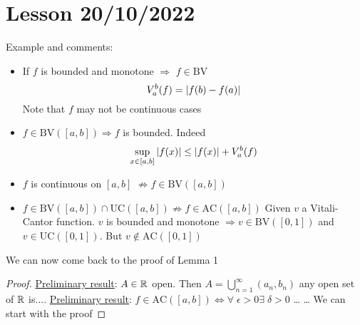 \section{Lesson 20/10/2022}
Example and comments:
\begin{itemize}
    \item If \(f\) is bounded and monotone \(\Longrightarrow\) \(f \in \mbox{BV}\)
    \[
        V_a^b (f) = \abs{f(b) - f(a)}
    \]
    Note that \(f\) may not be continuous
    cases
    \item \(f \in \mbox{BV}([a,b]) \Longrightarrow f\) is bounded. Indeed
    \[
        \sup_{x \in [a,b]} \abs{f(x)} \leq \abs{f(x)} + V_a^b(f)
    \]
    \item \(f\) is continuous on \([a,b]\) \(\not\Longrightarrow f \in \mbox{BV}([a,b])\)
    \item \(f \in \mbox{BV}([a,b]) \cap \mbox{UC}([a,b]) \not \Longrightarrow f \in \mbox{AC}([a,b])\)
    Given \(v\) a Vitali-Cantor function. \(v\) is bounded and monotone \(\Longrightarrow v \in \mbox{BV}([0,1])\) and \(v \in \mbox{UC}([0,1])\). But \(v \not \in \mbox{AC}([0,1])\)
\end{itemize}
We can now come back to the proof of Lemma 1
\begin{proof}
    \underline{Preliminary result}: \(A \in \mathbb{R}\) open. Then \(A = \bigcup_{n=1}^{\infty}(a_n, b_n)\)
    any open set of \(\mathbb{R}\) is....
    \underline{Preliminary result}: \(f \in \mbox{AC}([a,b]) \Longleftrightarrow \forall \; \epsilon > 0 \exists \; \delta > 0\)
    \dots
    \dots
    We can start with the proof
\end{proof}